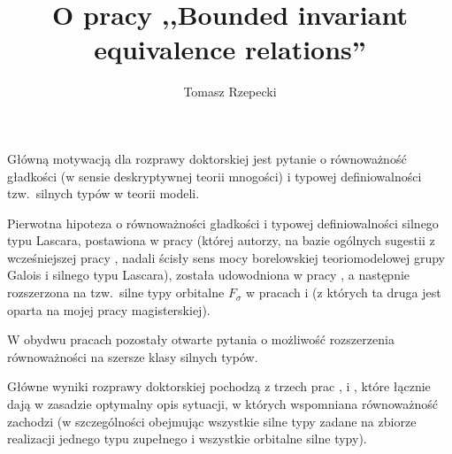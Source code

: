 \documentclass[12pt,a4paper]{article}
\title{O pracy ,,Bounded invariant equivalence relations''}
\author{Tomasz Rzepecki}
\date{}
\begin{document}
	\maketitle
	Główną motywacją dla rozprawy doktorskiej jest pytanie o równoważność gładkości (w sensie deskryptywnej teorii mnogości) i typowej definiowalności tzw.\ silnych typów w teorii modeli.
	
	Pierwotna hipoteza o równoważności gładkości i typowej definiowalności silnego typu Lascara, postawiona w pracy \cite{KPS13} (której autorzy, na bazie ogólnych sugestii z wcześniejszej pracy \cite{CLPZ01}, nadali ścisły sens mocy borelowskiej teoriomodelowej grupy Galois i silnego typu Lascara), została udowodniona w pracy \cite{KMS14}, a następnie rozszerzona na tzw.\ silne typy orbitalne $F_\sigma$ w pracach \cite{KM14} i \cite{KR16} (z których ta druga jest oparta na mojej pracy magisterskiej).
	
	W obydwu pracach pozostały otwarte pytania o możliwość rozszerzenia równoważności na szersze klasy silnych typów.
	
	Główne wyniki rozprawy doktorskiej pochodzą z trzech prac \cite{KPR15}, \cite{Rz16} i \cite{KR18}, które łącznie dają w zasadzie optymalny opis sytuacji, w których wspomniana równoważność zachodzi (w szczególności obejmując wszystkie silne typy zadane na zbiorze realizacji jednego typu zupełnego i wszystkie orbitalne silne typy).
	
\end{document}
